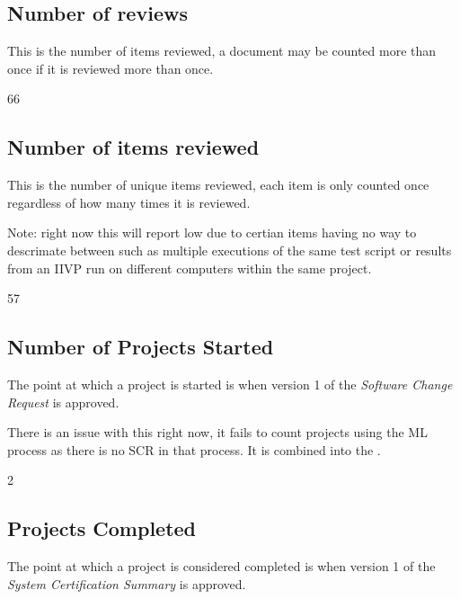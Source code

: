 \documentclass{article}
\begin{document}
\subsection{Number of reviews}
This is the number of items reviewed, a document may be counted more than once if it is reviewed
more than once.
\begin{Schunk}
\begin{Soutput}
[1] 66
\end{Soutput}
\end{Schunk}

\subsection{Number of items reviewed}
This is the number of unique items reviewed, each item is only counted once regardless of
how many times it is reviewed.

Note: right now this will report low due to certian items having no way to descrimate between
such as multiple executions of the same test script or results from an IIVP run on different
computers within the same project.
\begin{Schunk}
\begin{Soutput}
[1] 57
\end{Soutput}
\end{Schunk}

\subsection{Number of Projects Started}
The point at which a project is started is when version 1 of the \textit{Software
Change Request} is approved.

There is an issue with this right now, it fails to count projects using the ML process
as there is no SCR in that process. It is combined into the .


\begin{Schunk}
\begin{Soutput}
[1] 2
\end{Soutput}
\end{Schunk}

\subsection{Projects Completed}

The point at which a project is considered completed is when version 1 of the
\textit{System Certification Summary} is approved.
\end{document}
